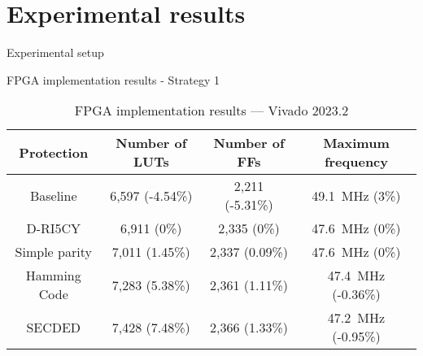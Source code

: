 \section{Experimental results}

\begin{frame}{Experimental setup}
    
\end{frame}
\begin{frame}{FPGA implementation results - Strategy 1}
    \begin{table}[t]
        \footnotesize
        \centering
        \caption{FPGA implementation results — Vivado 2023.2}
        \label{tab:chap5_implementation}
        \begin{tabular}{@{}c|ccc@{}}
            \toprule
            Protection    & Number of LUTs   & Number of FFs    & Maximum frequency                \\ \midrule
            Baseline      & 6,597 (-4.54\%) & 2,211 (-5.31\%) & \SI{49.1}{\mega\hertz} (3\%)     \\
            D-RI5CY       & 6,911 (0\%)     & 2,335 (0\%)     & \SI{47.6}{\mega\hertz} (0\%)     \\
            Simple parity & 7,011 (1.45\%)  & 2,337 (0.09\%)  & \SI{47.6}{\mega\hertz} (0\%)     \\
            Hamming Code  & 7,283 (5.38\%)  & 2,361 (1.11\%)  & \SI{47.4}{\mega\hertz} (-0.36\%) \\
            SECDED        & 7,428 (7.48\%)  & 2,366 (1.33\%)  & \SI{47.2}{\mega\hertz} (-0.95\%) \\
            \bottomrule
        \end{tabular}
    \end{table}
\end{frame}
